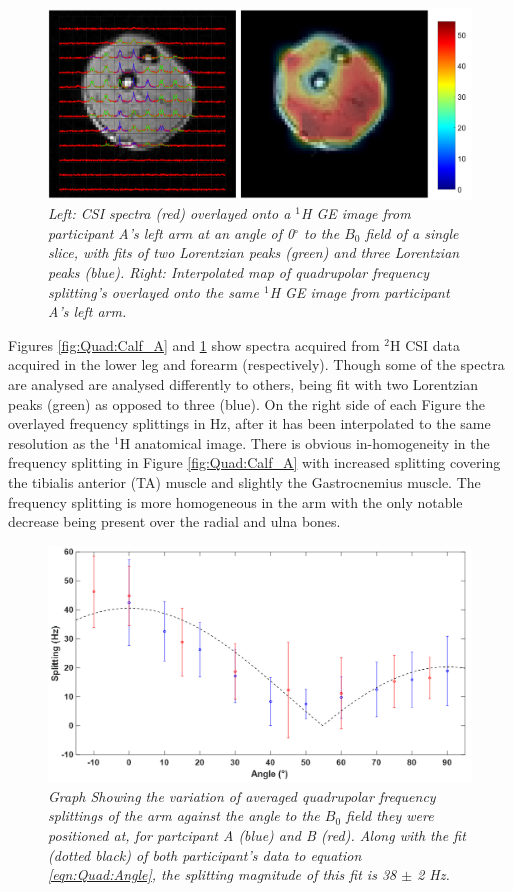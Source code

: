 \documentclass[class=article, crop=false]{standalone}
\begin{document}
\begin{figure}
    \centering
    \includegraphics[width=1\textwidth]{Figures/Quad/Arm_A.png}
    \caption{\textit{Left: CSI spectra (red) overlayed onto a $^1$H GE image from participant A's left arm at an angle of 0$^\circ$ to the $B_0$ field of a single slice, with fits of two Lorentzian peaks (green) and three Lorentzian peaks (blue). Right: Interpolated map of quadrupolar frequency splitting's overlayed onto the same $^1$H GE image from participant A's left arm.}}
    \label{fig:Quad:Arm_A}
\end{figure}

Figures \ref{fig:Quad:Calf_A} and \ref{fig:Quad:Arm_A} show spectra acquired from $^2$H CSI data acquired in the lower leg and forearm (respectively). Though some of the spectra are analysed are analysed differently to others, being fit with two Lorentzian peaks (green) as opposed to three (blue). On the right side of each Figure the overlayed frequency splittings in Hz, after it has been interpolated to the same resolution as the $^1$H anatomical image. There is obvious in-homogeneity in the frequency splitting in Figure \ref{fig:Quad:Calf_A} with increased splitting covering the tibialis anterior (TA) muscle and slightly the Gastrocnemius muscle. The frequency splitting is more homogeneous in the arm with the only notable decrease being present over the radial and ulna bones.

\begin{figure}
    \centering
    \includegraphics[width=1\textwidth]{Figures/Quad/Split_Angle_1.png}
    \caption{\textit{Graph Showing the variation of averaged quadrupolar frequency splittings of the arm against the angle to the $B_0$ field they were positioned at, for partcipant A (blue) and B (red). Along with the fit (dotted black) of both participant's data to equation \ref{eqn:Quad:Angle}, the splitting magnitude of this fit is 38 $\pm$ 2 Hz.}}
    \label{fig:Quad:Split_Angle_1}
\end{figure}
\end{document}
